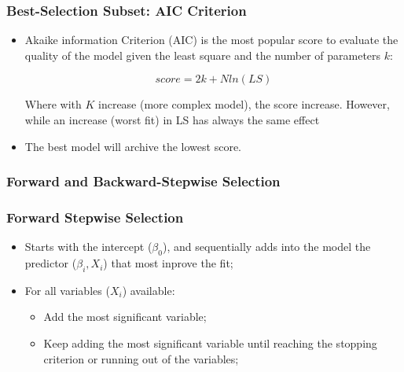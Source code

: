 \begin{frame}
    \frametitle{Best-Selection Subset: AIC Criterion}
  
    \begin{itemize}
        \item Akaike information Criterion (AIC) is the most popular score to evaluate
        the quality of the model given the least square and the number of parameters $k$:

        $$score = 2k + Nln(LS)$$

        Where with $K$ increase (more complex model), the score increase. However, 
        while an increase (worst fit) in LS has always the same effect

        \item The best model will archive the lowest score. 
    \end{itemize}

\end{frame}




\subsubsection {Forward and Backward-Stepwise Selection}

\begin{frame}
    \frametitle{Forward Stepwise Selection}

    \begin{itemize}

        \item Starts with the intercept ($\beta_0$), and sequentially adds into the model
        the predictor ($\beta_i, X_i$) that most inprove the fit;

        \item For all variables ($X_i$) available:
        \begin{itemize}
            \item Add the most significant variable;
            \item Keep adding the most significant variable until reaching the stopping criterion or
            running out of the variables;
        \end{itemize}

    \end{itemize}
\end{frame}


